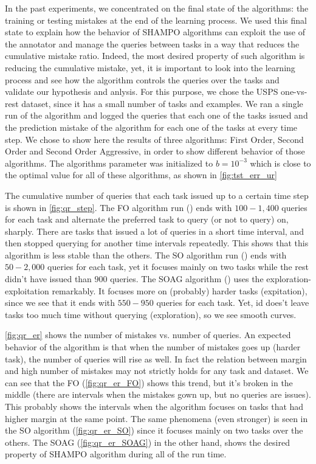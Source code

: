 \noindent
In the past experiments, we concentrated on the final state of the algorithms: 
the training or testing mistakes at the end of the learning process. We used 
this final state to explain how the behavior of SHAMPO algorithms can exploit the use of the annotator and 
manage the queries between tasks in a way that reduces the cumulative mistake ratio. Indeed, the most desired 
property of such algorithm is reducing the cumulative mistake, yet, it is important to
look into the learning process and see how the algorithm controls the queries 
over the tasks and validate our hypothesis and anlysis. For this purpose, we chose the USPS one-vs-rest dataset, since it has a small number of 
tasks and examples. We ran a single run of the algorithm and logged the 
queries that each one of the tasks issued and the prediction mistake of the 
algorithm for each one of the tasks at every time step. We chose to show here the 
results of three algorithms: First Order, Second Order and Second Order Aggressive, in order to show 
different behavior of those algorithms. The algorithms parameter was initialized to $b=10^{-3}$ 
which is close to the optimal value for all of these algorithms, as shown in \eqref{fig:tst_err_ur}

The cumulative number of queries that each task issued up to a certain time step is shown in 
\eqref{fig:qr_step}. The FO algorithm run () ends with $100-1,400$ queries for each task and alternate 
the preferred task to query (or not to query) on, sharply. There are tasks that 
issued a lot of queries in a short time interval, and then stopped querying for 
another time intervals repeatedly. This shows that this algorithm is 
less stable than the others. The SO algorithm run ()  ends with $50-2,000$ queries for each 
task, yet it focuses mainly on two tasks while the rest didn't have issued than $900$ 
queries. The SOAG algorithm () uses the exploration-exploitation remarkably. It 
focuses more on (probably) harder tasks (expitation), since we see that it ends with $550-950$ queries for each 
task. Yet, id does't leave tasks too much time without querying (exploration), so we see smooth curves.

\eqref{fig:qr_er} shows the number of mistakes vs. number of queries. An expected 
behavior of the algorithm is that when the number of mistakes goes up (harder 
task), the number of queries will rise as well. In fact the relation between 
margin and high number of mistakes may not strictly holds for any task and 
dataset. We can see that the FO (\eqref{fig:qr_er_FO}) shows this trend, but it's 
broken in the middle (there are intervals when the mistakes gown up, but no queries are 
issues). This probably shows the intervals when the algorithm focuses on tasks 
that had higher margin at the same point. The same phenomena (even stronger) is seen in the SO algorithm 
(\eqref{fig:qr_er_SO}) since it focuses mainly on two tasks over the others. The SOAG (\eqref{fig:qr_er_SOAG}) 
in the other hand, shows the desired property of SHAMPO algorithm during all of the run time. 


